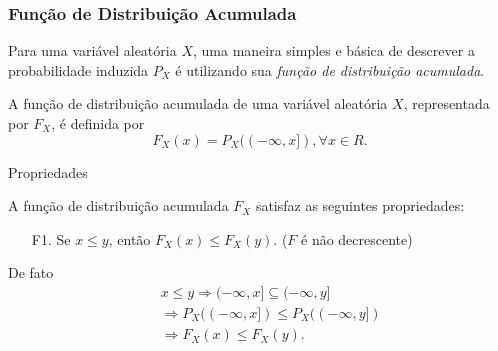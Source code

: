 \begin{frame}
\frametitle{\textbf{Função de Distribuição Acumulada}}
%
Para uma variável aleatória $X$, uma maneira simples e básica de
descrever a probabilidade induzida $P_X$ é utilizando sua {\em
função de distribuição acumulada}.
%
\begin{defi}
A função de distribuição acumulada de uma variável aleatória $X$,
representada por $F_X$, é definida por
%
$$F_X(x)=P_X((-\infty, x]), \forall x\in R.$$
\end{defi}

\begin{block}{Propriedades}

A função de distribuição acumulada $F_X$ satisfaz as seguintes
propriedades:
\begin{enumerate}
\item[F1.] Se $x\leq y$, então $F_X(x)\leq F_X(y)$. ($F$ é não decrescente)
\end{enumerate}
De fato
\begin{eqnarray}
& & x\leq y \Rightarrow (-\infty, x]\subseteq (-\infty, y] \nonumber \\
& & \Rightarrow P_X((-\infty, x])\leq P_X((-\infty, y])\nonumber \\
& & \Rightarrow F_X(x)\leq F_X(y).\nonumber
\end{eqnarray}

\end{block}
\end{frame}
%
%



